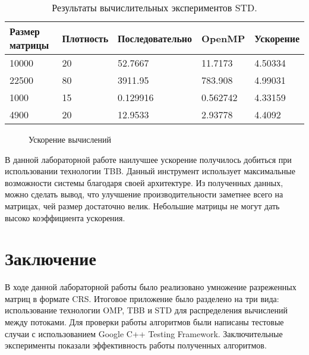 \documentclass{report}
\begin{document}
\begin{table}[!h]
\begin{tabular}{ | l | l | l | l | | l }
\hline
Размер матрицы & Плотность & Последовательно & OpenMP & Ускорение \\ \hline
10000& 20 & 52.7667 & 11.7173 & 4.50334 \\
22500& 80 & 3911.95 & 783.908 & 4.99031 \\
1000 & 15 & 0.129916 & 0.562742 & 4.33159 \\
4900 & 20 & 12.9533 & 2.93778 & 4.4092 \\ \hline
\end{tabular}
\caption{Результаты вычислительных экспериментов STD.}
\end{table}
\newpage
\begin{figure}[htbp]
\centering
{}
\caption{Ускорение вычислений}
\label{fig:apsp}
\end{figure}
\par В данной лабораторной работе наилучшее ускорение получилось добиться при использовании технологии TBB. Данный инструмент использует максимальные возможности системы благодаря своей архитектуре. Из полученных данных, можно сделать вывод, что улучшение производительности заметнее всего на матрицах, чей размер достаточно велик. Небольшие матрицы не могут дать высоко коэффициента ускорения.
\newpage
\section*{Заключение}
\par В ходе данной лабораторной работы было реализовано умножение разреженных матриц в формате CRS. Итоговое приложение было разделено на три вида: использование технологии OMP, TBB и STD для распределения вычислений между потоками. Для проверки работы алгоритмов были написаны тестовые случаи с использованием Google C++ Testing Framework. Заключительные эксперименты показали эффективность работы полученных алгоритмов.
\newpage
\end{document}
